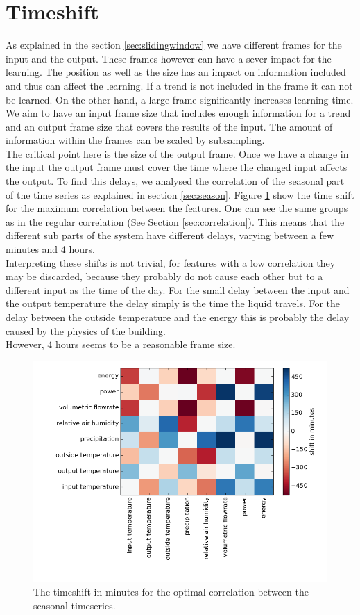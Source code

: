 \documentclass{scrartcl}
\begin{document}
\section{Timeshift}
As explained in the section \ref{sec:slidingwindow} we have different frames for the input and the output. These frames however can have a sever impact for the learning. The position as well as the size has an impact on information included and thus can affect the learning. If a trend is not included in the frame it can not be learned. On the other hand, a large frame significantly increases learning time. We aim to have an input frame size that includes enough information for a trend and an output frame size that covers the results of the input. The amount of information within the frames can be scaled by subsampling.\\
The critical point here is the size of the output frame. Once we have a change in the input the output frame must cover the time where the changed input affects the output. To find this delays, we analysed the correlation of the seasonal part of the time series as explained in section \ref{sec:season}. Figure \ref{fig:timeshift} show the time shift for the maximum correlation between the features. One can see the same groups as in the regular correlation (See Section \ref{sec:correlation}). This means that the different sub parts of the system have different delays, varying between a few minutes and 4 hours.\\
Interpreting these shifts is not trivial, for features with a low correlation they may be discarded, because they probably do not cause each other but to a different input as the time of the day. For the small delay between the input and the output temperature the delay simply is the time the liquid travels. For the delay between the outside temperature and the energy this is probably the delay caused by the physics of the building.\\
However, 4 hours seems to be a reasonable frame size.


\begin{figure}[H]
  \centering
  \includegraphics[width=0.5\linewidth]{img/timeshift.png}
  \caption{The timeshift in minutes for the optimal correlation between the seasonal timeseries.}
  \label{fig:timeshift}
\end{figure}
\end{document}
